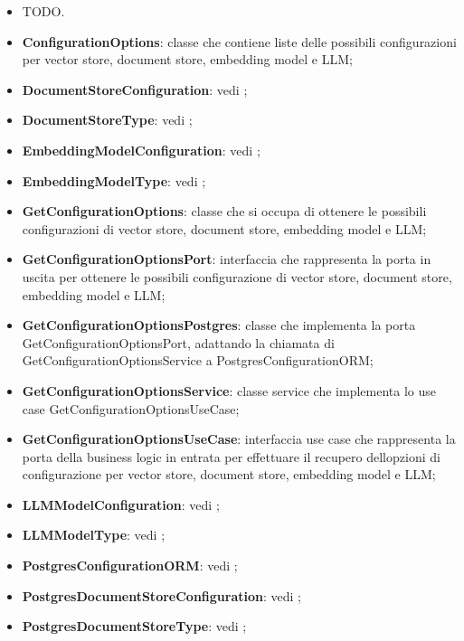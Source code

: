 \documentclass[10pt, a4paper]{article}
\begin{document}
    \begin{itemize}
            \item TODO.
    \end{itemize}
    

\begin{itemize}
    \item \label{ConfigurationOptions}\textbf{ConfigurationOptions}: classe che contiene liste delle possibili configurazioni per vector store, document store, embedding model e LLM;
    \item \textbf{DocumentStoreConfiguration}: vedi ;
    \item \textbf{DocumentStoreType}: vedi ;
    \item \textbf{EmbeddingModelConfiguration}: vedi ;
    \item \textbf{EmbeddingModelType}: vedi ;
    \item \label{GetConfigurationOptions}\textbf{GetConfigurationOptions}: classe che si occupa di ottenere le possibili configurazioni di vector store, document store, embedding model e LLM; 
    
     \item \label{GetConfigurationOptionsPort}\textbf{GetConfigurationOptionsPort}: interfaccia che rappresenta la porta in uscita per ottenere le possibili configurazione di vector store, document store, embedding model e LLM;
    \item \label{GetConfigurationOptionsPostgres}\textbf{GetConfigurationOptionsPostgres}: classe che implementa la porta GetConfigurationOptionsPort, adattando la chiamata di GetConfigurationOptionsService a PostgresConfigurationORM;
    \item \label{GetConfigurationOptionsService}\textbf{GetConfigurationOptionsService}: classe service che implementa lo use case GetConfigurationOptionsUseCase;
    \item \label{GetConfigurationOptionsUseCase}\textbf{GetConfigurationOptionsUseCase}: interfaccia use case che rappresenta la porta della business logic in entrata per effettuare il recupero dellopzioni di configurazione per vector store, document store, embedding model e LLM; 
    \item \textbf{LLMModelConfiguration}: vedi ;
    \item \textbf{LLMModelType}: vedi ;
    \item \textbf{PostgresConfigurationORM}: vedi ;
    \item \textbf{PostgresDocumentStoreConfiguration}: vedi ;
    \item \textbf{PostgresDocumentStoreType}: vedi ;


\end{itemize}
\end{document}
